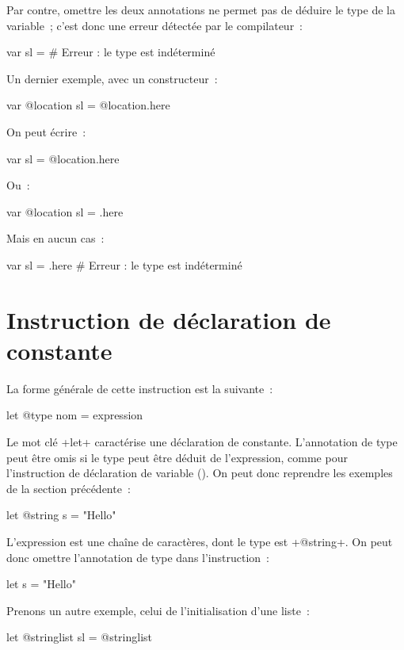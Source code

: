 Par contre, omettre les deux annotations ne permet pas de déduire le type de la variable~; c'est donc une erreur détectée par le compilateur~:
\begin{galgas}
var sl = {} # Erreur : le type est indéterminé
\end{galgas}

Un dernier exemple, avec un constructeur~:
\begin{galgas}
var @location sl = @location.here
\end{galgas}

On peut écrire~:
\begin{galgas}
var sl = @location.here
\end{galgas}

Ou~:
\begin{galgas}
var @location sl = .here
\end{galgas}

Mais en aucun cas~:
\begin{galgas}
var sl = .here # Erreur : le type est indéterminé
\end{galgas}





\section{Instruction de déclaration de constante}

La forme générale de cette instruction est la suivante~:

\begin{galgasbox}
let @type nom = expression
\end{galgasbox}

Le mot clé \ggs+let+ caractérise une déclaration de constante. L'annotation de type peut être omis si le type peut être déduit de l'expression, comme pour l'instruction de déclaration de variable (). On peut donc reprendre les exemples de la section précédente~:
\begin{galgas}
let @string s = "Hello"
\end{galgas}

L'expression est une chaîne de caractères, dont le type est \ggs+@string+. On peut donc omettre l'annotation de type dans l'instruction~:
\begin{galgas}
let s = "Hello"
\end{galgas}


Prenons un autre exemple, celui de l'initialisation d'une liste~:
\begin{galgas}
let @stringlist sl = @stringlist {}
\end{galgas}

